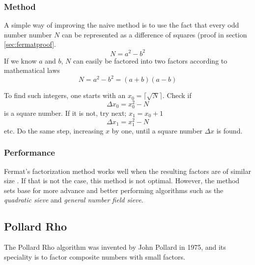 \documentclass[a4paper, 12pt]{report}
\begin{document}
\subsubsection{Method}
A simple way of improving the naive method is to use the fact that every odd number number $N$ can be represented as a difference of squares (proof in section \ref{sec:fermatproof}.
\begin{equation}
N = a^2 - b^2
\end{equation}
If we know $a$ and $b$, $N$ can easily be factored into two factors according to mathematical laws
\begin{equation}
N = a^2 - b^2 = (a + b)(a - b)
\end{equation}

To find such integers, one starts with an $x_0 = \lceil \sqrt{N} \rceil $. Check if 
\begin{equation}
\Delta x_0 = x_0^2 - N
\end{equation}
is a square number. If it is not, try next; $x_1 = x_0 + 1$
\begin{equation}
\Delta x_1 = x_1^2 - N
\end{equation}
etc. Do the same step, increasing $x$ by one, until a square number $ \Delta x $ is found.

\subsubsection{Performance}
Fermat's factorization method works well when the resulting factors are of similar size \cite{mathdep}. If that is not the case, this method is not optimal. However, the method sets base for more advance and better performing algorithms such as the \emph{quadratic sieve} and \emph{general number field sieve}.

\subsection{Pollard Rho}
The Pollard Rho algorithm was invented by John Pollard in 1975, and its speciality is to factor composite numbers with small factors.
\end{document}
